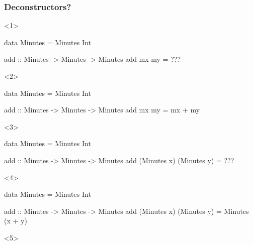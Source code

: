 \documentclass[17pt]{beamer}
\renewcommand{\(}[1]{\begin{columns}[#1]}
\renewcommand{\)}{\end{columns}}
\newcommand{\<}[1]{\begin{column}{#1}}
\renewcommand{\>}{\end{column}}
\begin{document}
\begin{frame}[fragile]
\frametitle{Deconstructors?}
\begin{minipage}[t][.4\textheight]{\textwidth}
\begin{onlyenv}<1>
  \begin{code}
    data Minutes = Minutes Int

    add :: Minutes -> Minutes -> Minutes
    add mx my = ???
  \end{code}
\end{onlyenv}
\begin{onlyenv}<2>
  \begin{code}
    data Minutes = Minutes Int

    add :: Minutes -> Minutes -> Minutes
    add mx my = mx + my
  \end{code}
\end{onlyenv}
\begin{onlyenv}<3>
  \begin{code}
    data Minutes = Minutes Int

    add :: Minutes -> Minutes -> Minutes
    add (Minutes x) (Minutes y) = ???
  \end{code}
\end{onlyenv}
\begin{onlyenv}<4>
  \begin{code}
    data Minutes = Minutes Int

    add :: Minutes -> Minutes -> Minutes
    add (Minutes x) (Minutes y) = Minutes (x + y)
  \end{code}%
\end{onlyenv}
\begin{onlyenv}<5>
\end{onlyenv}
\end{minipage}
\begin{minipage}[c][.3\textheight]{\textwidth}
\begin{center}
\end{center}
\end{minipage}
\end{frame}
\end{document}
